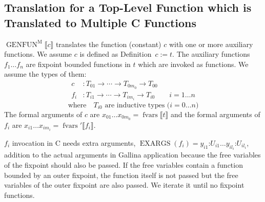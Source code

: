 \documentclass[a4paper,fleqn]{article}
\def\gallina{\textrm{Gallina}}
\newcommand{\kwDefinition}{\mbox{\color{myviolet}\ttfamily Definition}}
\DeclareMathOperator{\EXARGS}{EXARGS}
\newcommand{\BRA}[1]{\llbracket #1 \rrbracket}
\DeclareMathOperator{\genfunop}{GENFUN}
\newcommand{\genfunm}[1]{\genfunop^\mathrm{M}\BRA{#1}}
\DeclareMathOperator{\fvarsop}{fvars}
\newcommand{\fvars}[1]{\fvarsop\BRA{#1}}
\newcommand{\fvarsd}[1]{\fvarsop'\BRA{#1}}
\begin{document}
\subsection{Translation for a Top-Level Function which is Translated to Multiple C Functions}\label{sec:genfunm}
$\genfunm{c}$ translates the function (constant) $c$ with one or more auxiliary functions.
We assume $c$ is defined as \kwDefinition~$c := t.$
The auxiliary functions $f_1 \ldots f_n$ are fixpoint bounded functions in $t$ which are invoked as functions.
We assume the types of them:
\begin{align*}
  c &: T_{01} \rightarrow \dotsb \rightarrow T_{0m_0} \rightarrow T_{00} \\
  f_i &: T_{i1} \rightarrow \dotsb \rightarrow T_{im_i} \rightarrow T_{i0} && i = 1\ldots n
\end{align*}
\[ \text{where} \quad \text{$T_{i0}$ are inductive types ($i=0\ldots n$)} \]
The formal arguments of $c$ are $x_{01}\ldots x_{0m_0} = \fvars{t}$ and
the formal arguments of $f_i$ are $x_{i1}\ldots x_{im_i} = \fvarsd{f_i}$.

$f_i$ invocation in C needs extra arguments, $\EXARGS(f_i) = y_{i1}\mathord{:}U_{i1} \ldots y_{il_i}\mathord{:}U_{il_i}$, addition to the actual arguments in \gallina{} application because the free variables of the fixpoint should also be passed.
If the free variables contain a function bounded by an outer fixpoint, the function itself is not passed but the free variables of the outer fixpoint are also passed.
We iterate it until no fixpoint functions.
\end{document}
